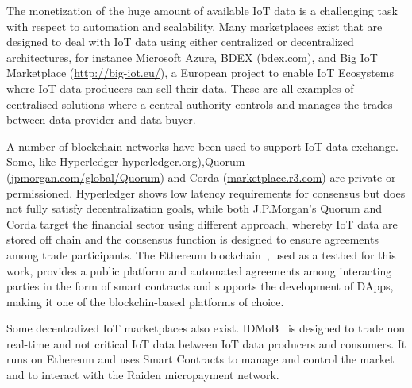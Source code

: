 \documentclass[letterpaper, 10 pt, conference]{ieeeconf}  %
\begin{document}

The monetization of the huge amount of available IoT data is a challenging task with respect to automation and scalability. 
Many marketplaces exist that are designed to deal with IoT data using  either centralized or  decentralized architectures, for instance Microsoft Azure, BDEX (\url{bdex.com}), 
and Big IoT Marketplace (\url{http://big-iot.eu/}), a European project to enable IoT Ecosystems where IoT data producers can sell their data.
These are all examples of centralised solutions where a central authority controls and manages the trades between data provider and data buyer.
 
A number of blockchain networks have been used to support IoT data exchange. Some, like Hyperledger \url{hyperledger.org}),Quorum (\url{jpmorgan.com/global/Quorum}) and Corda (\url{marketplace.r3.com}) are private or permissioned.
Hyperledger shows low latency requirements for consensus but does not fully satisfy decentralization goals, while both J.P.Morgan's Quorum  and Corda target the financial sector using different approach, whereby  IoT data are stored off chain and the consensus function is designed to ensure agreements among trade participants. 
 The Ethereum blockchain~\cite{Buterin2014}, used as a testbed for this work,  provides a public platform and automated agreements among interacting parties in the form of smart contracts and supports the development of DApps, making it one of the blockchin-based platforms of choice.

Some decentralized IoT marketplaces also exist. IDMoB~\cite{IDMoB} is designed to trade non real-time and not critical IoT data between IoT data producers and  consumers.
It runs on Ethereum and uses Smart Contracts to manage and control the market and to interact with the Raiden micropayment network.
\end{document}
